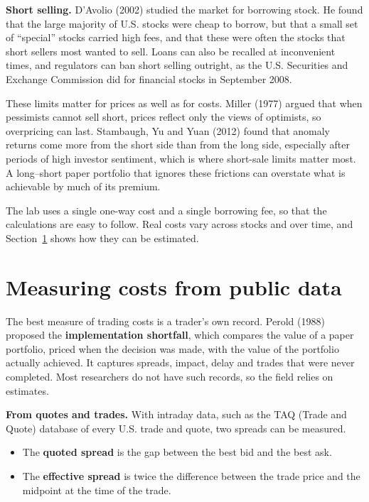 \textbf{Short selling.} D'Avolio (2002) studied the market for borrowing stock. He found that the large majority of U.S. stocks were cheap to borrow, but that a small set of ``special'' stocks carried high fees, and that these were often the stocks that short sellers most wanted to sell. Loans can also be recalled at inconvenient times, and regulators can ban short selling outright, as the U.S. Securities and Exchange Commission did for financial stocks in September 2008.

These limits matter for prices as well as for costs. Miller (1977) argued that when pessimists cannot sell short, prices reflect only the views of optimists, so overpricing can last. Stambaugh, Yu and Yuan (2012) found that anomaly returns come more from the short side than from the long side, especially after periods of high investor sentiment, which is where short-sale limits matter most. A long--short paper portfolio that ignores these frictions can overstate what is achievable by much of its premium.

The lab uses a single one-way cost and a single borrowing fee, so that the calculations are easy to follow. Real costs vary across stocks and over time, and Section~\ref{sec:04-measuring} shows how they can be estimated.

\section{Measuring costs from public data}
\label{sec:04-measuring}

The best measure of trading costs is a trader's own record. Perold (1988) proposed the \textbf{implementation shortfall}, which compares the value of a paper portfolio, priced when the decision was made, with the value of the portfolio actually achieved. It captures spreads, impact, delay and trades that were never completed. Most researchers do not have such records, so the field relies on estimates.

\textbf{From quotes and trades.} With intraday data, such as the TAQ (Trade and Quote) database of every U.S. trade and quote, two spreads can be measured.

\begin{itemize}
  \item The \textbf{quoted spread} is the gap between the best bid and the best ask.
  \item The \textbf{effective spread} is twice the difference between the trade price and the midpoint at the time of the trade.
\end{itemize}

